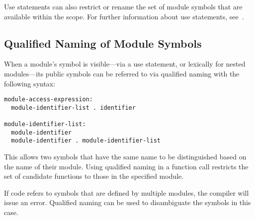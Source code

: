 Use statements can also restrict or rename the set of module symbols
that are available within the scope.  For further information about
use statements, see~.


\subsection{Qualified Naming of Module Symbols}
\label{Explicit_Naming}

When a module's symbol is visible---via a use statement, or lexically
for nested modules---its public symbols can be referred to via
qualified naming with the following syntax:
\begin{syntax}
\begin{verbatim}
module-access-expression:
  module-identifier-list . identifier

module-identifier-list:
  module-identifier
  module-identifier . module-identifier-list

\end{verbatim}
\end{syntax}
This allows two symbols that have the same name to be distinguished
based on the name of their module.  Using qualified naming in a
function call restricts the set of candidate functions to those in the
specified module.

If code refers to symbols that are defined by multiple modules, the
compiler will issue an error.  Qualified naming can be used to
disambiguate the symbols in this case.


